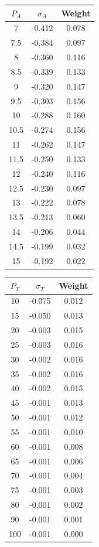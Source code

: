 \documentclass[letter,12pt]{article}
\numberwithin{equation}{section}
\begin{document}
\pagebreak

\begin{multicols}{2}
\begin{tabular}[h]{|c|c|c|}
\hline
$P_A$  & $\sigma_A$ & Weight \\ \hline
7 & -0.412 & 0.078 \\ \hline
7.5 & -0.384 & 0.097 \\ \hline
8 & -0.360 & 0.116 \\ \hline
8.5 & -0.339 & 0.133 \\ \hline
9 & -0.320 & 0.147 \\ \hline
9.5 & -0.303 & 0.156 \\ \hline
10 & -0.288 & 0.160 \\ \hline
10.5 & -0.274 & 0.156 \\ \hline
11 & -0.262 & 0.147 \\ \hline
11.5 & -0.250 & 0.133 \\ \hline
12 & -0.240 & 0.116 \\ \hline
12.5 & -0.230 & 0.097 \\ \hline
13 & -0.222 & 0.078 \\ \hline
13.5 & -0.213 & 0.060 \\ \hline
14 & -0.206 & 0.044 \\ \hline
14.5 & -0.199 & 0.032 \\ \hline
15 & -0.192 & 0.022 \\ \hline
\end{tabular}
\label{Table:SigmaA}

\columnbreak

\begin{tabular}[h]{|c|c|c|}
\hline

$P_T$ & $\sigma_T$ & Weight \\ \hline
10 & -0.075 & 0.012 \\ \hline
15 & -0.050 & 0.013 \\ \hline
20 & -0.003 & 0.015 \\ \hline
25 & -0.003 & 0.016 \\ \hline
30 & -0.002 & 0.016 \\ \hline
35 & -0.002 & 0.016 \\ \hline
40 & -0.002 & 0.015 \\ \hline
45 & -0.001 & 0.013 \\ \hline
50 & -0.001 & 0.012 \\ \hline
55 & -0.001 & 0.010 \\ \hline
60 & -0.001 & 0.008 \\ \hline
65 & -0.001 & 0.006 \\ \hline
70 & -0.001 & 0.004 \\ \hline
75 & -0.001 & 0.003 \\ \hline
80 & -0.001 & 0.002 \\ \hline
90 & -0.001 & 0.001 \\ \hline
100 & -0.001 & 0.000 \\ \hline
\end{tabular}
\label{Table:SigmaT}
\end{multicols}
\end{document}
